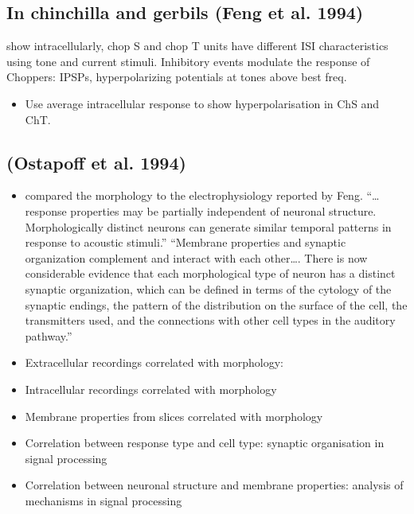\documentclass[10pt,a4paper]{article}
\begin{document}
\subsection{In chinchilla and gerbils (Feng et al. 1994)}
 show intracellularly, chop S and
chop T units have different ISI characteristics using tone and current stimuli.
Inhibitory events modulate the response of Choppers: IPSPs, hyperpolarizing
potentials at tones above best freq.


\begin{itemize}
\item Use average intracellular response to show hyperpolarisation in ChS and
  ChT.
\end{itemize}

\subsection{(Ostapoff et al. 1994)}


\begin{itemize}
\item compared the morphology to the electrophysiology reported by Feng.
  {\textquotedblleft}{\dots} response properties may be partially independent of
  neuronal structure. Morphologically distinct neurons can generate similar
  temporal patterns in response to acoustic stimuli.{\textquotedblright}
  {\textquotedblleft}Membrane properties and synaptic organization complement
  and interact with each other{\dots}. There is now considerable evidence that
  each morphological type of neuron has a distinct synaptic organization, which
  can be defined in terms of the cytology of the synaptic endings, the pattern
  of the distribution on the surface of the cell, the transmitters used, and the
  connections with other cell types in the auditory pathway.{\textquotedblright}
\item Extracellular recordings correlated with
  morphology:\citep{Bourk:1976,BourkMielcarzEtAl:1981,BrawerMorest:1975,BrawerMorestEtAl:1974,CantMorest:1984,GodfreyKiangEtAl:1975,Kane:1973,OstapoffMorestEtAl:1994,RitzBrownell:1982,TolbertMorest:1982a,
    TolbertMorest:1982b,WinterPalmer:1990,YoungRobertEtAl:1988}
\item Intracellular recordings correlated with morphology
  \citep{RhodeOertelEtAl1983,RhodeSmithEtAl:1983,RhodeGreenberg:1992,RoullierRyugo:1984,SmithRhode:1987,SmithRhode:1985,SmithRhode:1989}
\item Membrane properties from slices correlated with morphology
  \citep{HirschOertel:1988,HirschOertel:1988a,ManisMarx:1991,Oertel:1983,OertelWu:1989,OertelWuEtAl:1990,WuOertel:1984}
\item Correlation between response type and cell type: synaptic organisation in
  signal processing
\item Correlation between neuronal structure and membrane properties: analysis
  of mechanisms in signal processing
\end{itemize}
\end{document}
